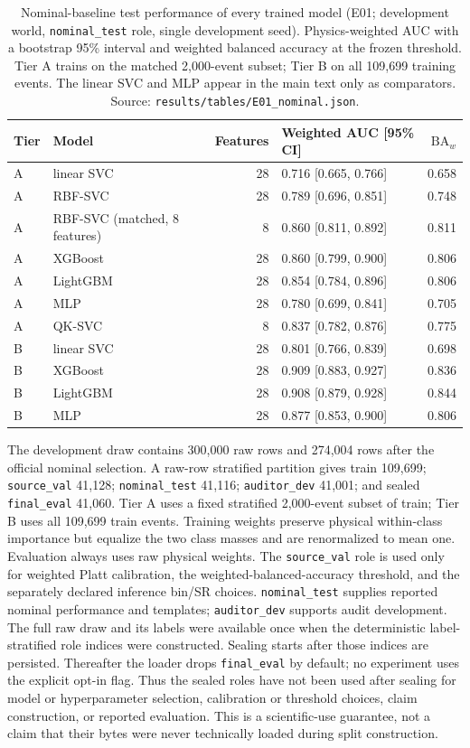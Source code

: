 \documentclass[11pt,a4paper]{article}
\begin{document}
\begin{table}[H]
\centering
\small
\caption{Nominal-baseline test performance of every trained model (E01;
development world, \texttt{nominal\_test} role, single development seed).
Physics-weighted AUC with a bootstrap 95\% interval and weighted balanced
accuracy at the frozen threshold. Tier A trains on the matched 2,000-event
subset; Tier B on all 109,699 training events. The linear SVC and MLP appear
in the main text only as comparators. Source:
\texttt{results/tables/E01\_nominal.json}.}
\label{tab:e01models}
\begin{tabular}{llrlr}
\toprule
Tier & Model & Features & Weighted AUC [95\% CI] & $\mathrm{BA}_w$ \\
\midrule
A & linear SVC & 28 & 0.716 [0.665, 0.766] & 0.658 \\
A & RBF-SVC & 28 & 0.789 [0.696, 0.851] & 0.748 \\
A & RBF-SVC (matched, 8 features) & 8 & 0.860 [0.811, 0.892] & 0.811 \\
A & XGBoost & 28 & 0.860 [0.799, 0.900] & 0.806 \\
A & LightGBM & 28 & 0.854 [0.784, 0.896] & 0.806 \\
A & MLP & 28 & 0.780 [0.699, 0.841] & 0.705 \\
A & QK-SVC & 8 & 0.837 [0.782, 0.876] & 0.775 \\
B & linear SVC & 28 & 0.801 [0.766, 0.839] & 0.698 \\
B & XGBoost & 28 & 0.909 [0.883, 0.927] & 0.836 \\
B & LightGBM & 28 & 0.908 [0.879, 0.928] & 0.844 \\
B & MLP & 28 & 0.877 [0.853, 0.900] & 0.806 \\
\bottomrule
\end{tabular}
\end{table}

The development draw contains 300,000 raw rows and 274,004 rows after the
official nominal selection. A raw-row stratified partition gives train
109,699; \texttt{source\_val} 41,128; \texttt{nominal\_test} 41,116;
\texttt{auditor\_dev} 41,001; and sealed \texttt{final\_eval} 41,060. Tier A
uses a fixed stratified 2,000-event subset of train; Tier B uses all 109,699
train events. Training weights preserve physical within-class importance but
equalize the two class masses and are renormalized to mean one. Evaluation
always uses raw physical weights. The \texttt{source\_val} role is used only
for weighted Platt calibration, the weighted-balanced-accuracy threshold, and
the separately declared inference bin/SR choices. \texttt{nominal\_test}
supplies reported nominal performance and templates; \texttt{auditor\_dev}
supports audit development. The full raw draw and its labels were available
once when the deterministic label-stratified role indices were constructed.
Sealing starts after those indices are persisted. Thereafter the loader drops
\texttt{final\_eval} by default; no experiment uses the explicit opt-in flag.
Thus the sealed roles have not been used after sealing for model or
hyperparameter selection, calibration or threshold choices, claim
construction, or reported evaluation. This is a scientific-use guarantee,
not a claim that their bytes were never technically loaded during split
construction.
\end{document}
